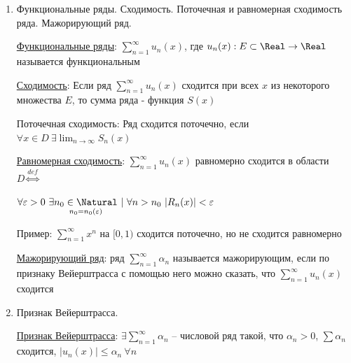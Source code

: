 \begin{enumerate}
    \hyperlink{changingsignseries}{Знакопеременные ряды}: $\sum_{n = 1}^\infty u_n$, где $u_n$ -- любого знака и не все $u_n$ одного знака

    \hyperlink{absoluteconvergence}{Абсолютная сходимость}: $\sum_{n = 1}^\infty |u_n|$ сходится $\Longrightarrow \sum_{n = 1}^\infty u_n$ сходится абсолютно

    \hyperlink{conditionalconvergence}{Условная сходимость}: $\sum_{n = 1}^\infty u_n$ сходится условно, если $\sum_{n = 1}^\infty |u_n|$ расходится

\subsection{X.2. Функциональные ряды.}

    \item Функциональные ряды. Сходимость. Поточечная и равномерная сходимость ряда.
    Мажорирующий ряд.

    \hyperlink{functionalseries}{Функциональные ряды}: $\sum_{n = 1}^\infty u_n(x)$, где $u_n(x) : E \subset \Real \to \Real$ называется функциональным

    \hyperlink{functionalseriesconvergence}{Сходимость}: Если ряд $\sum_{n = 1}^\infty u_n(x)$ сходится при всех $x$ из некоторого множества $E$, то сумма ряда -
    функция $S(x)$

    Поточечная сходимость: Ряд сходится поточечно, если $\forall x \in D \ \exists \lim_{n \to \infty} S_n(x)$

    \hyperlink{uniformconvergence}{Равномерная сходимость}:  $\sum_{n = 1}^\infty u_n(x)$ равномерно сходится в области $D \overset{def}{\Longleftrightarrow}$

    $\forall \varepsilon > 0 \ \exists \underset{n_0 = n_0(\varepsilon)}{n_0 \in \Natural} \ | \ \forall n > n_0 \ |R_n(x)| < \varepsilon$

    Пример: $\sum_{n = 1}^\infty x^n$ на $[0,1)$ сходится поточечно, но не сходится равномерно

    \hyperlink{majorseries}{Мажорирующий ряд}: ряд $\sum_{n = 1}^\infty \alpha_n$ называется мажорирующим, если по 
    признаку Вейерштрасса с помощью него можно сказать, что $\sum_{n = 1}^\infty u_n(x)$ сходится

    \item Признак Вейерштрасса.

    \hyperlink{weierstrassign}{Признак Вейерштрасса}: $\exists \sum_{n = 1}^\infty \alpha_n$ -- числовой ряд такой, что $\alpha_n > 0$, $\sum \alpha_n$ сходится,
    $|u_n(x)| \leq \alpha_n \ \forall n$


\end{enumerate}
